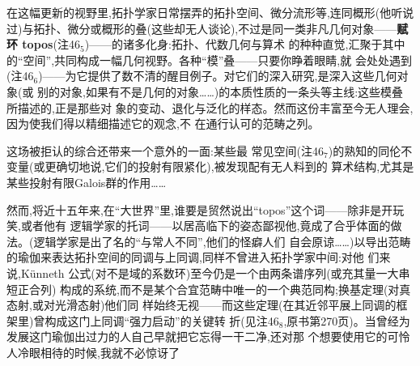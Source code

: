 在这幅更新的视野里,拓扑学家日常摆弄的拓扑空间、微分流形等,连同概形(他听说过)与拓扑、微分或概形的叠(这些却无人谈论),不过是同一类非凡几何对象——\textbf{赋环 topos}(注46$_{5}$)——的诸多化身:拓扑、代数几何与算术
的种种直觉,汇聚于其中的“空间”,共同构成一幅几何视野。各种“模”叠——只要你睁着眼睛,就
会处处遇到(注46$_{6}$)——为它提供了数不清的醒目例子。对它们的深入研究,是深入这些几何对象(或
别的对象,如果有不是几何的对象……)的本质性质的一条头等主线:这些模叠所描述的,正是那些对
象的变动、退化与泛化的样态。然而这份丰富至今无人理会,因为使我们得以精细描述它的观念,不
在通行认可的范畴之列。

这场被拒认的综合还带来一个意外的一面:\dmark{}某些最
常见空间(注46$_{7}$)的熟知的同伦不变量(或更确切地说,它们的投射有限紧化),被发现配有无人料到的
算术结构,尤其是某些投射有限Galois群的作用……

然而,将近十五年来,在“大世界”里,谁要是贸然说出“topos”这个词——除非是开玩笑,或者他有
逻辑学家的托词——以居高临下的姿态鄙视他,竟成了合乎体面的做法。(逻辑学家是出了名的“与常人不同”,他们的怪癖人们
自会原谅……)以导出范畴的瑜伽来表达拓扑空间的同调与上同调,同样不曾进入拓扑学家中间:对他
们来说,Künneth 公式(对不是域的系数环)至今仍是一个由两条谱序列(或充其量一大串短正合列)
构成的系统,而不是某个合宜范畴中唯一的一个典范同构;换基定理(对真态射,或对光滑态射)他们同
样始终无视——而这些定理(在其近邻平展上同调的框架里)曾构成这门上同调“强力启动”的关键转
折(见注46$_{8}$,原书第270页)。当曾经为发展这门瑜伽出过力的人自己早就把它忘得一干二净,还对那
个想要使用它的可怜人冷眼相待的时候,我就不必惊讶了

